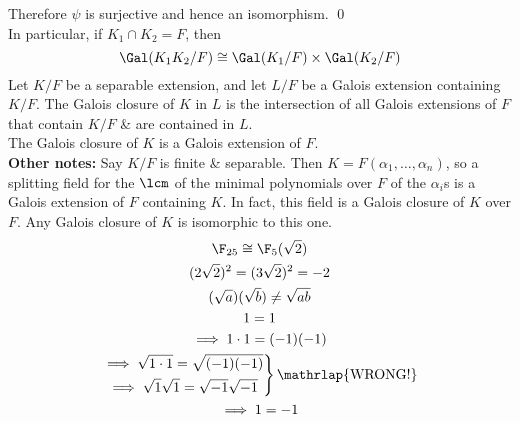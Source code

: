 Therefore $\psi$ is surjective and hence an isomorphism. \qed \\
In particular, if $K_1\cap K_2=F$, then 
\[ \Gal(K_1K_2/F) \cong \Gal(K_1/F)\times\Gal(K_2/F) \]
%
 Let $K/F$ be a separable extension, and let $L/F$ be a Galois extension containing $K/F$.  The Galois closure of $K$ in $L$ is the intersection of all Galois extensions of $F$ that contain $K/F$ \& are contained in $L$. \\
\note The Galois closure of $K$ is a Galois extension of $F$. \\
\textbf{Other notes: }Say $K/F$ is finite \& separable.  Then $K=F(\alpha_1,\dotsc,\alpha_n)$, so a splitting field for the $\lcm$ of the minimal polynomials over $F$ of the $\alpha_i$s is a Galois extension of $F$ containing $K$.  In fact, this field is a Galois closure of $K$ over $F$.  Any Galois closure of $K$ is isomorphic to this one.
%
%
\begin{gather*}
\F_{25}\cong\F_5(\sqrt2) \\
(2\sqrt2)^2=(3\sqrt2)^2=-2 \\
(\sqrt{a})(\sqrt{b})\neq\sqrt{ab} \\
1 = 1 \\
\implies 1\cdot1 = (-1)(-1) \\
\left.\begin{gathered}
\implies \sqrt{1\cdot1} = \sqrt{(-1)(-1)} \\
\implies \sqrt{1}\sqrt{1} = \sqrt{-1}\sqrt{-1}
\end{gathered}\right\}\mathrlap{\text{WRONG!}} \\
\implies 1 = -1
\end{gather*}
